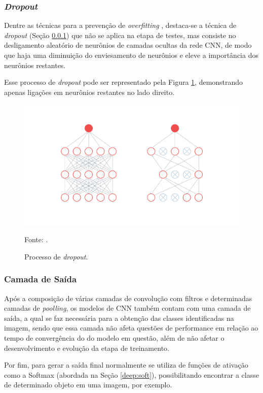 \subsubsection{\textit{Dropout}}
\label{deep:dropout}

Dentre as técnicas para a prevenção de \textit{overfitting} \cite{Goodfellow2016}, destaca-se a técnica de \textit{dropout} (Seção \ref{deep:dropout}) que não se aplica na etapa de testes, mas consiste no desligamento aleatório de neurônios de camadas ocultas da rede CNN, de modo que haja uma diminuição do enviesamento de neurônios e eleve a importância dos neurônios restantes.

Esse processo de \textit{dropout} pode ser representado pela Figura \ref{deep:fig:9}, demonstrando apenas ligações em neurônios restantes no lado direito.

\begin{figure}[H]
    \centering
    \caption{Processo de \textit{dropout}.}
    \includegraphics[width=1\linewidth]{recursos/imagens/deep/dropout.png}
    \label{deep:fig:9}
    
    \vspace*{1 cm}
    Fonte: \cite{PeltarionAI}.
\end{figure}


\subsubsection{Camada de Saída}
\label{deep:output}

Após a composição de várias camadas de convolução com filtros e determinadas camadas de \textit{poolling}, os modelos de CNN também contam com uma camada de saída, a qual se faz necessária para a obtenção das classes identificadas na imagem, sendo que essa camada não afeta questões de performance em relação ao tempo de convergência do do modelo em questão, além de não afetar o desenvolvimento e evolução da etapa de treinamento.

Por fim, para gerar a saída final normalmente se utiliza de funções de ativação como a Softmax (abordada na Seção \ref{deep:soft}), possibilitando encontrar a classe de determinado objeto em uma imagem, por exemplo.